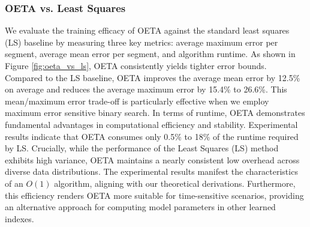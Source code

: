 \subsubsection{OETA vs. Least Squares} 
\label{sec:oeta_vs_ls}

We evaluate the training efficacy of OETA against the standard least squares (LS) baseline by measuring three key metrics: average maximum error per segment, average mean error per segment, and algorithm runtime. As shown in Figure \ref{fig:oeta_vs_ls}, OETA consistently yields tighter error bounds. Compared to the LS baseline, OETA improves the average mean error by 12.5\% on average and reduces the average maximum error by 15.4\% to 26.6\%. This mean/maximum error trade-off is particularly effective when we employ maximum error sensitive binary search. In terms of runtime, OETA demonstrates fundamental advantages in computational efficiency and stability. Experimental results indicate that OETA consumes only 0.5\% to 18\% of the runtime required by LS. Crucially, while the performance of the Least Squares (LS) method exhibits high variance, OETA maintains a nearly consistent low overhead across diverse data distributions. The experimental results manifest the characteristics of an $O(1)$ algorithm, aligning with our theoretical derivations. Furthermore, this efficiency renders OETA more suitable for time-sensitive scenarios, providing an alternative approach for computing model parameters in other learned indexes.


